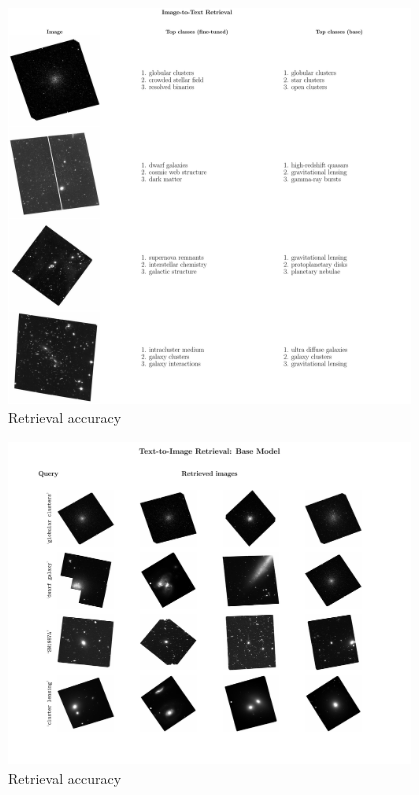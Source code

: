 \documentclass[10pt]{article} %
\begin{document}
\begin{figure}[!h]
\includegraphics[width=0.95\textwidth]{plots/itt.pdf}
\caption{Retrieval accuracy}
\label{fig:itt}
\end{figure}

\begin{figure}[!h]
\includegraphics[width=0.95\textwidth]{plots/tti_base.pdf}
\caption{Retrieval accuracy}
\label{fig:tti}
\end{figure}
\end{document}
